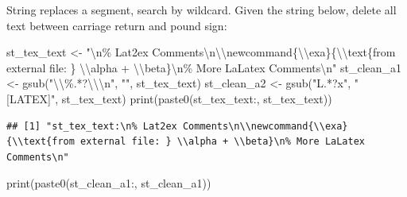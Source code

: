 \documentclass[
]{book}
\newenvironment{Shaded}{\begin{snugshade}}{\end{snugshade}}
\newcommand{\FunctionTok}[1]{\textcolor[rgb]{0.00,0.00,0.00}{#1}}
\newcommand{\NormalTok}[1]{#1}
\newcommand{\OtherTok}[1]{\textcolor[rgb]{0.56,0.35,0.01}{#1}}
\newcommand{\SpecialCharTok}[1]{\textcolor[rgb]{0.00,0.00,0.00}{#1}}
\newcommand{\StringTok}[1]{\textcolor[rgb]{0.31,0.60,0.02}{#1}}
\begin{document}
String replaces a segment, search by wildcard. Given the string below, delete all text between carriage return and pound sign:

\begin{Shaded}
\begin{Highlighting}[]
\NormalTok{st\_tex\_text }\OtherTok{\textless{}{-}} \StringTok{"}\SpecialCharTok{\textbackslash{}n}\StringTok{\% Lat2ex Comments}\SpecialCharTok{\textbackslash{}n\textbackslash{}\textbackslash{}}\StringTok{newcommand\{}\SpecialCharTok{\textbackslash{}\textbackslash{}}\StringTok{exa\}\{}\SpecialCharTok{\textbackslash{}\textbackslash{}}\StringTok{text\{from external file: \} }\SpecialCharTok{\textbackslash{}\textbackslash{}}\StringTok{alpha + }\SpecialCharTok{\textbackslash{}\textbackslash{}}\StringTok{beta\}}\SpecialCharTok{\textbackslash{}n}\StringTok{\% More LaLatex Comments}\SpecialCharTok{\textbackslash{}n}\StringTok{"}
\NormalTok{st\_clean\_a1 }\OtherTok{\textless{}{-}} \FunctionTok{gsub}\NormalTok{(}\StringTok{"}\SpecialCharTok{\textbackslash{}\textbackslash{}}\StringTok{\%.*?}\SpecialCharTok{\textbackslash{}\textbackslash{}\textbackslash{}n}\StringTok{"}\NormalTok{, }\StringTok{""}\NormalTok{, st\_tex\_text)}
\NormalTok{st\_clean\_a2 }\OtherTok{\textless{}{-}} \FunctionTok{gsub}\NormalTok{(}\StringTok{"L.*?x"}\NormalTok{, }\StringTok{"[LATEX]"}\NormalTok{, st\_tex\_text)}
\FunctionTok{print}\NormalTok{(}\FunctionTok{paste0}\NormalTok{(}\StringTok{\textquotesingle{}st\_tex\_text:\textquotesingle{}}\NormalTok{, st\_tex\_text))}
\end{Highlighting}
\end{Shaded}

\begin{verbatim}
## [1] "st_tex_text:\n% Lat2ex Comments\n\\newcommand{\\exa}{\\text{from external file: } \\alpha + \\beta}\n% More LaLatex Comments\n"
\end{verbatim}

\begin{Shaded}
\begin{Highlighting}[]
\FunctionTok{print}\NormalTok{(}\FunctionTok{paste0}\NormalTok{(}\StringTok{\textquotesingle{}st\_clean\_a1:\textquotesingle{}}\NormalTok{, st\_clean\_a1))}
\end{Highlighting}
\end{Shaded}
\end{document}
